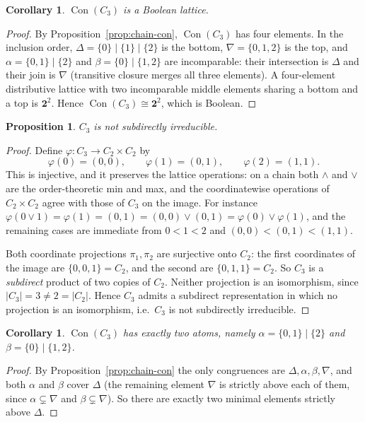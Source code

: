 \documentclass[11pt]{article}
\newtheorem{corollary}[theorem]{Corollary}
\newtheorem{proposition}[theorem]{Proposition}
\theoremstyle{definition}
\newcommand{\Con}{\operatorname{Con}}
\begin{document}
\begin{corollary}\label{cor:con3-boolean}
$\Con(C_3)$ is a Boolean lattice.
\end{corollary}

\begin{proof}
By Proposition~\ref{prop:chain-con}, $\Con(C_3)$ has four elements. In the
inclusion order, $\Delta = \{0\}\!\mid\!\{1\}\!\mid\!\{2\}$ is the bottom,
$\nabla = \{0,1,2\}$ is the top, and $\alpha = \{0,1\}\!\mid\!\{2\}$ and
$\beta = \{0\}\!\mid\!\{1,2\}$ are incomparable: their intersection is
$\Delta$ and their join is $\nabla$ (transitive closure merges all three
elements). A four-element distributive lattice with two incomparable middle
elements sharing a bottom and a top is $\mathbf{2}^2$. Hence
$\Con(C_3) \cong \mathbf{2}^2$, which is Boolean.
\end{proof}

\begin{proposition}\label{prop:c3-not-si}
$C_3$ is not subdirectly irreducible.
\end{proposition}

\begin{proof}
Define $\varphi : C_3 \to C_2 \times C_2$ by
\[
\varphi(0) = (0,0), \qquad \varphi(1) = (0,1), \qquad \varphi(2) = (1,1).
\]
This is injective, and it preserves the lattice operations: on a chain both
$\wedge$ and $\vee$ are the order-theoretic min and max, and the coordinatewise
operations of $C_2 \times C_2$ agree with those of $C_3$ on the image. For
instance $\varphi(0 \vee 1) = \varphi(1) = (0,1) = (0,0) \vee (0,1) =
\varphi(0) \vee \varphi(1)$, and the remaining cases are immediate from
$0 < 1 < 2$ and $(0,0) < (0,1) < (1,1)$.

Both coordinate projections $\pi_1, \pi_2$ are surjective onto $C_2$: the
first coordinates of the image are $\{0, 0, 1\} = C_2$, and the second are
$\{0, 1, 1\} = C_2$. So $C_3$ is a \emph{subdirect} product of two copies of
$C_2$. Neither projection is an isomorphism, since $|C_3| = 3 \neq 2 =
|C_2|$. Hence $C_3$ admits a subdirect representation in which no projection is
an isomorphism, i.e.\ $C_3$ is not subdirectly irreducible.
\end{proof}

\begin{corollary}\label{cor:c3-atoms}
$\Con(C_3)$ has exactly two atoms, namely $\alpha = \{0,1\}\!\mid\!\{2\}$ and
$\beta = \{0\}\!\mid\!\{1,2\}$.
\end{corollary}

\begin{proof}
By Proposition~\ref{prop:chain-con} the only congruences are
$\Delta, \alpha, \beta, \nabla$, and both $\alpha$ and $\beta$ cover $\Delta$
(the remaining element $\nabla$ is strictly above each of them, since
$\alpha \subsetneq \nabla$ and $\beta \subsetneq \nabla$). So there are exactly
two minimal elements strictly above $\Delta$.
\end{proof}
\end{document}
